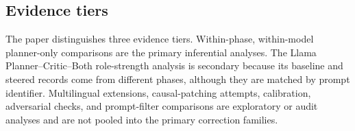 \subsection{Evidence tiers}
The paper distinguishes three evidence tiers. Within-phase, within-model planner-only comparisons are the primary inferential analyses. The Llama Planner--Critic--Both role-strength analysis is secondary because its baseline and steered records come from different phases, although they are matched by prompt identifier. Multilingual extensions, causal-patching attempts, calibration, adversarial checks, and prompt-filter comparisons are exploratory or audit analyses and are not pooled into the primary correction families.